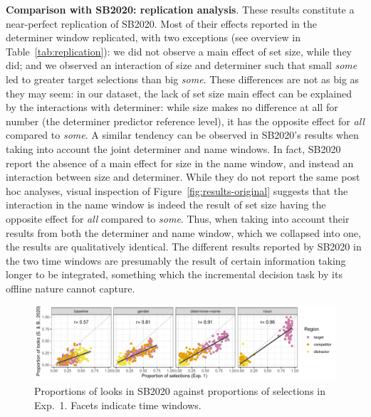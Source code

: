 \documentclass[10pt,letterpaper]{article}
\newcommand{\tableref}[1]{Table~\ref{#1}}
\newcommand{\figref}[1]{Figure~\ref{#1}}
\newcommand{\expref}[1]{Exp.~#1}
\newcommand{\jd}[1]{\textcolor{Red}{\textbf{[jd: #1]}}}
\begin{document}



\textbf{Comparison with SB2020: replication analysis}. These results constitute a near-perfect replication of  SB2020. Most of their effects reported in the determiner window replicated, with two exceptions (see overview in \tableref{tab:replication}): we did not observe a main effect of set size, while they did; and we observed an interaction of size and determiner such that small \emph{some} led to greater target selections than big \emph{some}. These differences are not as big as they may seem: in our dataset, the lack of set size main effect can be explained by the interactions with determiner: while size makes no difference at all for number (the determiner predictor reference level), it has the opposite effect for \emph{all} compared to \emph{some}. A similar tendency can be observed in SB2020's results when taking into account the joint determiner and name windows. In fact,  SB2020 report the absence of a main effect for size in the name window, and instead an interaction between size and determiner. While they do not report the same post hoc analyses, visual inspection of \figref{fig:results-original} suggests that the interaction in the name window is indeed the result of set size having the opposite effect for \emph{all} compared to \emph{some}. Thus, when taking into account their results from both the determiner and name window, which we collapsed into one, the results are qualitatively identical. The different results reported by  SB2020 in the two time windows are presumably the result of certain information taking longer to be integrated, something which the incremental decision task by its offline nature cannot capture. %

\begin{figure}
\centering
\includegraphics[width=.9\textwidth]{../../analysis/SunBreheny/1_incremental/main/graphs/corr-window}
\caption{Proportions of looks in SB2020 against proportions of selections in \expref{1}. Facets indicate time windows.} 
\label{fig:corr-window}
\end{figure}
\end{document}
